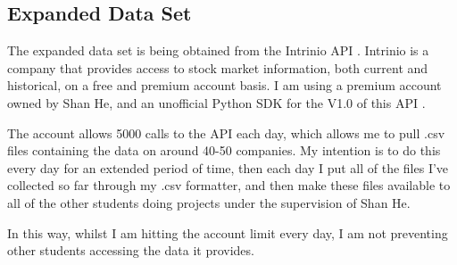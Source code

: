 \subsection{Expanded Data Set}
The expanded data set is being obtained from the Intrinio API \cite{intrinioApi}. Intrinio is a company that provides access to stock market information, both current and historical, on a free and premium account basis. I am using a premium account owned by Shan He, and an unofficial Python SDK for the V1.0 of this API \cite{intrinioPython}. \newline

The account allows 5000 calls to the API each day, which allows me to pull .csv files containing the data on around 40-50 companies. My intention is to do this every day for an extended period of time, then each day I put all of the files I've collected so far through my .csv formatter, and then make these files available to all of the other students doing projects under the supervision of Shan He. \newline

In this way, whilst I am hitting the account limit every day, I am not preventing other students accessing the data it provides. \newline
